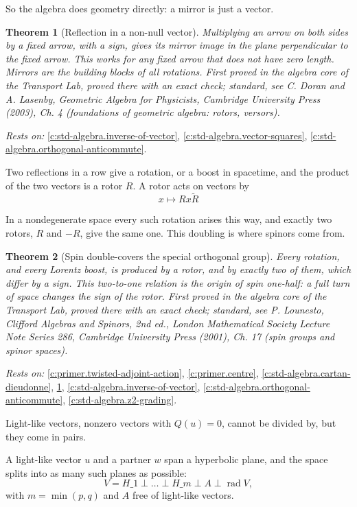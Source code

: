 \documentclass[11pt]{article}
\newtheorem{theorem}{Theorem}[section]
\theoremstyle{definition}
\theoremstyle{plain}
\begin{document}
So the algebra does geometry directly: a mirror is just a vector.

\begin{theorem}[Reflection in a non-null vector]\label{c:std-algebra.reflection}
Multiplying an arrow on both sides by a fixed arrow, with a sign, gives its mirror image in the plane perpendicular to the fixed arrow. This works for any fixed arrow that does not have zero length. Mirrors are the building blocks of all rotations.
\emph{First proved in} the algebra core of the Transport Lab, proved there with an exact check; standard, see C. Doran and A. Lasenby, Geometric Algebra for Physicists, Cambridge University Press (2003), Ch. 4 (foundations of geometric algebra: rotors, versors).
\end{theorem}
\noindent\emph{Rests on:} \ref{c:std-algebra.inverse-of-vector}, \ref{c:std-algebra.vector-squares}, \ref{c:std-algebra.orthogonal-anticommute}.

Two reflections in a row give a rotation, or a boost in spacetime, and the product of the two vectors is a rotor $R$. A rotor acts on vectors by \[ x \mapsto R x \tilde{R} \]

In a nondegenerate space every such rotation arises this way, and exactly two rotors, $R$ and $-R$, give the same one. This doubling is where spinors come from.

\begin{theorem}[Spin double-covers the special orthogonal group]\label{c:std-algebra.spin-double-cover}
Every rotation, and every Lorentz boost, is produced by a rotor, and by exactly two of them, which differ by a sign. This two-to-one relation is the origin of spin one-half: a full turn of space changes the sign of the rotor.
\emph{First proved in} the algebra core of the Transport Lab, proved there with an exact check; standard, see P. Lounesto, Clifford Algebras and Spinors, 2nd ed., London Mathematical Society Lecture Note Series 286, Cambridge University Press (2001), Ch. 17 (spin groups and spinor spaces).
\end{theorem}
\noindent\emph{Rests on:} \ref{c:primer.twisted-adjoint-action}, \ref{c:primer.centre}, \ref{c:std-algebra.cartan-dieudonne}, \ref{c:std-algebra.reflection}, \ref{c:std-algebra.inverse-of-vector}, \ref{c:std-algebra.orthogonal-anticommute}, \ref{c:std-algebra.z2-grading}.

Light-like vectors, nonzero vectors with $Q(u) = 0$, cannot be divided by, but they come in pairs.

A light-like vector $u$ and a partner $w$ span a hyperbolic plane, and the space splits into as many such planes as possible: \[ V = H\_1 \perp \dots \perp H\_m \perp A \perp \operatorname{rad} V, \] with $m = \min(p, q)$ and $A$ free of light-like vectors.
\end{document}
